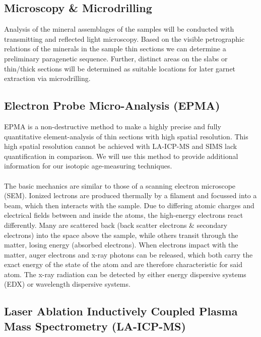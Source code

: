 \documentclass[a4paper,11pt,titlepage]{article}
\begin{document}
\subsection{Microscopy \& Microdrilling}

Analysis of the mineral assemblages of the samples will be conducted with transmitting and reflected light microscopy. Based on the visible petrographic relations of the minerals in the sample thin sections we can determine a preliminary paragenetic sequence. Further, distinct areas on the slabs or thin/thick sections will be determined as suitable locations for later garnet extraction via microdrilling.



\subsection{Electron Probe Micro-Analysis (EPMA)}

EPMA is a non-destructive method to make a highly precise and fully quantitative element-analysis of thin sections with high spatial resolution. This high spatial resolution cannot be achieved with LA-ICP-MS and SIMS lack quantification in comparison. We will use this method to provide additional information for our isotopic age-measuring techniques. 
\\
\\ The basic mechanics are similar to those of a scanning electron microscope (SEM). Ionized lectrons are produced thermally by a filament and focussed into a beam, which then interacts with the sample. Due to differing atomic charges and electrical fields between and inside the atoms, the high-energy electrons react differently. Many are scattered back (back scatter electrons \& secondary electrons) into the space above the sample, while others transit through the matter, losing energy (absorbed electrons). When electrons impact with the matter, auger electrons and x-ray photons can be released, which both carry the exact energy of the state of the atom and are therefore characteristic for said atom. The x-ray radiation can be detected by either energy dispersive systems (EDX) or wavelength dispersive systems.


\subsection{Laser Ablation Inductively Coupled Plasma Mass Spectrometry (LA-ICP-MS)}
\end{document}
